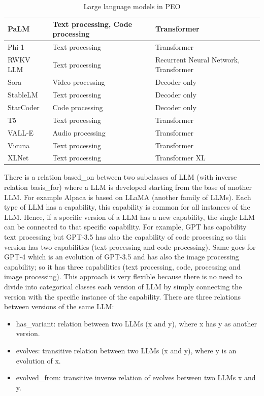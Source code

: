 \begin{table}[H]
\begin{tabular}{|>{\raggedright\arraybackslash}p{4cm}|>{\raggedright\arraybackslash}p{4cm}|>{\raggedright\arraybackslash}p{4cm}|}
        PaLM & Text processing, Code processing & Transformer \\ \hline
        Phi-1 & Text processing & Transformer \\ \hline
        RWKV LLM & Text processing & Recurrent Neural Network, Transformer \\ \hline
        Sora & Video processing & Decoder only \\ \hline
        StableLM & Text processing & Decoder only \\ \hline
        StarCoder & Code processing & Decoder only \\ \hline
        T5 & Text processing & Transformer \\ \hline
        VALL-E & Audio processing & Transformer \\ \hline
        Vicuna & Text processing & Transformer \\ \hline
        XLNet & Text processing & Transformer XL \\ \hline
    \end{tabular}
    \caption{Large language models in PEO}
\end{table}
There is a relation based\_on between two subclasses of LLM (with inverse relation basis\_for) where a LLM is developed starting from the base of another LLM.
For example Alpaca is based on LLaMA (another family of LLMs).
Each type of LLM has a capability, this capability is common for all instances of the LLM.
Hence, if a specific version of a LLM has a new capability, the single LLM can be connected to that specific capability. For example, GPT has capability text processing but GPT-3.5 has also the capability of code processing so this version has two capabilities (text processing and code processing).
Same goes for GPT-4 which is an evolution of GPT-3.5 and has also the image processing capability; so it has three capabilities (text processing, code, processing and image processing).
This approach is very flexible because there is no need to divide into categorical classes each version of LLM by simply connecting the version with the specific instance of the capability.
There are three relations between versions of the same LLM: 
\begin{itemize}
    \item has\_variant: relation between two LLMs (x and y), where x has y as another version.

    \item evolves: transitive relation between two LLMs (x and y), where y is an evolution of x. 

    \item evolved\_from: transitive inverse relation of evolves between two LLMs x and y.
\end{itemize}

